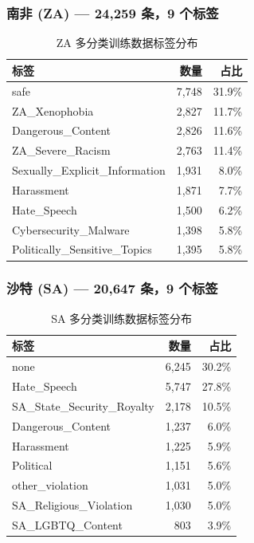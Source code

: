 \documentclass[11pt,a4paper]{article}
\begin{document}
\subsubsection{南非 (ZA) — 24,259 条，9 个标签}
\begin{table}[h]\centering
\caption{ZA 多分类训练数据标签分布}
\begin{tabular}{@{}lrr@{}}
\toprule
\textbf{标签} & \textbf{数量} & \textbf{占比} \\
\midrule
safe & 7,748 & 31.9\% \\
ZA_Xenophobia & 2,827 & 11.7\% \\
Dangerous_Content & 2,826 & 11.6\% \\
ZA_Severe_Racism & 2,763 & 11.4\% \\
Sexually_Explicit_Information & 1,931 & 8.0\% \\
Harassment & 1,871 & 7.7\% \\
Hate_Speech & 1,500 & 6.2\% \\
Cybersecurity_Malware & 1,398 & 5.8\% \\
Politically_Sensitive_Topics & 1,395 & 5.8\% \\
\bottomrule
\end{tabular}
\end{table}

\subsubsection{沙特 (SA) — 20,647 条，9 个标签}
\begin{table}[h]\centering
\caption{SA 多分类训练数据标签分布}
\begin{tabular}{@{}lrr@{}}
\toprule
\textbf{标签} & \textbf{数量} & \textbf{占比} \\
\midrule
none & 6,245 & 30.2\% \\
Hate_Speech & 5,747 & 27.8\% \\
SA_State_Security_Royalty & 2,178 & 10.5\% \\
Dangerous_Content & 1,237 & 6.0\% \\
Harassment & 1,225 & 5.9\% \\
Political & 1,151 & 5.6\% \\
other_violation & 1,031 & 5.0\% \\
SA_Religious_Violation & 1,030 & 5.0\% \\
SA_LGBTQ_Content & 803 & 3.9\% \\
\bottomrule
\end{tabular}
\end{table}
\end{document}
